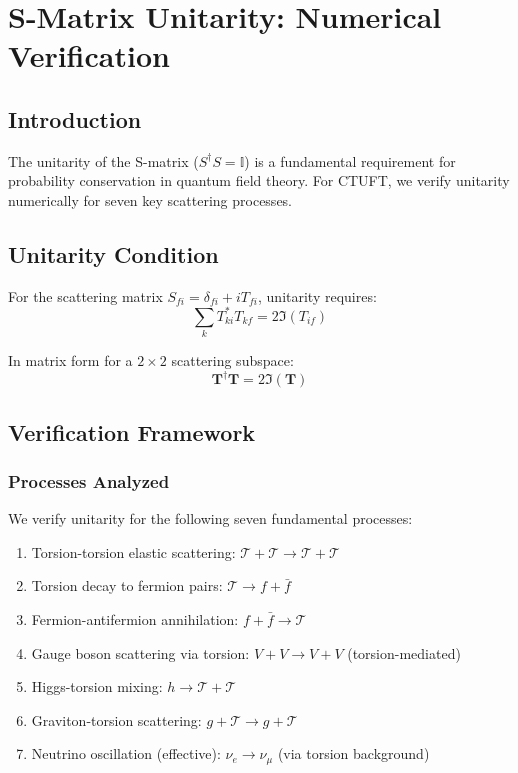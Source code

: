 \section{S-Matrix Unitarity: Numerical Verification}
\label{sec:unitarity}

\subsection{Introduction}

The unitarity of the S-matrix ($S^\dagger S = \mathbb{I}$) is a fundamental requirement for probability conservation in quantum field theory. For CTUFT, we verify unitarity numerically for seven key scattering processes.

\subsection{Unitarity Condition}

For the scattering matrix $S_{fi} = \delta_{fi} + i T_{fi}$, unitarity requires:
\begin{equation}
    \sum_k T^*_{ki} T_{kf} = 2 \Im(T_{if})
\end{equation}

In matrix form for a $2 \times 2$ scattering subspace:
\begin{equation}
    \mathbf{T}^\dagger \mathbf{T} = 2 \Im(\mathbf{T})
\end{equation}

\subsection{Verification Framework}

\subsubsection{Processes Analyzed}

We verify unitarity for the following seven fundamental processes:

\begin{enumerate}
    \item Torsion-torsion elastic scattering: $\mathcal{T} + \mathcal{T} \to \mathcal{T} + \mathcal{T}$
    \item Torsion decay to fermion pairs: $\mathcal{T} \to f + \bar{f}$
    \item Fermion-antifermion annihilation: $f + \bar{f} \to \mathcal{T}$
    \item Gauge boson scattering via torsion: $V + V \to V + V$ (torsion-mediated)
    \item Higgs-torsion mixing: $h \to \mathcal{T} + \mathcal{T}$
    \item Graviton-torsion scattering: $g + \mathcal{T} \to g + \mathcal{T}$
    \item Neutrino oscillation (effective): $\nu_e \to \nu_\mu$ (via torsion background)
\end{enumerate}

